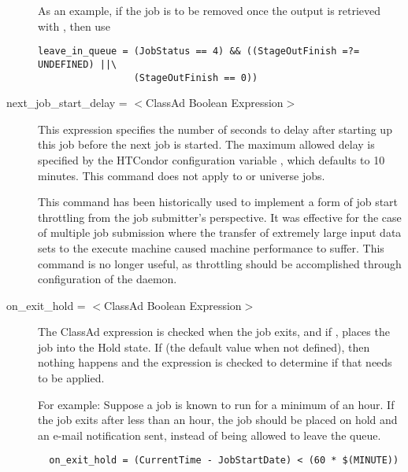 \begin{description}
As an example, if the job is to be removed once the output is retrieved
with , then use 
\footnotesize
\begin{verbatim}
leave_in_queue = (JobStatus == 4) && ((StageOutFinish =?= UNDEFINED) ||\
                 (StageOutFinish == 0))
\end{verbatim}
\normalsize


\label{condor-submit-next-job-start-delay}
\item[next\_job\_start\_delay = $<$ClassAd Boolean Expression$>$]
This expression specifies the number of seconds to delay after starting up
this job before the next job is started.  The maximum
allowed delay is specified by the HTCondor configuration variable
\Macro{MAX\_NEXT\_JOB\_START\_DELAY}, which defaults to 10 minutes.
This command does not apply to \SubmitCmd{scheduler}
or  universe jobs.

This command has been historically used to implement a form
of job start throttling from the job submitter's perspective.
It was effective for the case of multiple job submission where
the transfer of extremely large input data sets to the execute
machine caused machine performance to suffer.
This command is no longer useful, as throttling should be
accomplished through configuration of the  daemon.


\label{condor-submit-on-exit-hold}
\item[on\_exit\_hold = $<$ClassAd Boolean Expression$>$] 
The ClassAd expression is checked when the job exits, and if ,
places the job into the Hold state.
If  (the default value when not defined),
then nothing happens and the  expression is
checked to determine if that needs to be applied.

For example:
Suppose a job is known to run for a minimum of an hour.
If the job exits after less than an hour, the job should be placed on
hold and an e-mail notification sent,
instead of being allowed to leave the queue.

\footnotesize
\begin{verbatim}
  on_exit_hold = (CurrentTime - JobStartDate) < (60 * $(MINUTE))
\end{verbatim}
\normalsize


\end{description}
